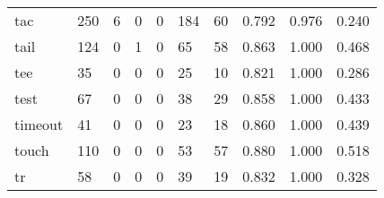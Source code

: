 \begin{longtable}{lp{2.0cm}p{2.0cm}p{2.0cm}p{2.0cm}p{2.0cm}p{2.0cm}p{2.0cm}p{2.0cm}p{2.0cm}}
tac       &                    250 &                                             6 &                                            0 &                                           0 &                                          184 &                                         60 &                                0.792 &                                  0.976 &                                0.240 \\
tail      &                    124 &                                             0 &                                            1 &                                           0 &                                           65 &                                         58 &                                0.863 &                                  1.000 &                                0.468 \\
tee       &                     35 &                                             0 &                                            0 &                                           0 &                                           25 &                                         10 &                                0.821 &                                  1.000 &                                0.286 \\
test      &                     67 &                                             0 &                                            0 &                                           0 &                                           38 &                                         29 &                                0.858 &                                  1.000 &                                0.433 \\
timeout   &                     41 &                                             0 &                                            0 &                                           0 &                                           23 &                                         18 &                                0.860 &                                  1.000 &                                0.439 \\
touch     &                    110 &                                             0 &                                            0 &                                           0 &                                           53 &                                         57 &                                0.880 &                                  1.000 &                                0.518 \\
tr        &                     58 &                                             0 &                                            0 &                                           0 &                                           39 &                                         19 &                                0.832 &                                  1.000 &                                0.328 \\

\end{longtable}
